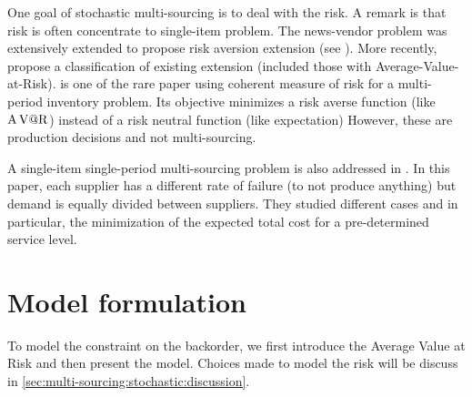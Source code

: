 One goal of stochastic multi-sourcing is to deal with the risk.
A remark is that risk is often concentrate to single-item problem.
The news-vendor problem was extensively extended to propose risk aversion extension (see \cite{Vipul2000,Choi2008}).
More recently, \cite{Arikan2017} propose a classification of existing extension (included those with Average-Value-at-Risk).
\cite{Ahmed2007} is one of the rare paper using coherent measure of risk for a multi-period inventory problem.
Its objective minimizes a risk averse function (like $\operatorname{A\operatorname{V@R}}$) instead of a risk neutral function (like expectation)
However, these are production decisions and not multi-sourcing.


A single-item single-period multi-sourcing problem is also addressed in \cite{Meena2011}.
In this paper, each supplier has a different rate of failure (\ie to not produce anything) but demand is equally divided between suppliers.
They studied different cases and in particular, the minimization of the expected total cost for a pre-determined service level.














\section{Model formulation}
\label{sec:multi-sourcing:stochastic:model-formulation}


To model the constraint on the backorder, we first introduce the Average Value at Risk and then present the model.
Choices made to model the risk will be discuss in \cref{sec:multi-sourcing:stochastic:discussion}.


